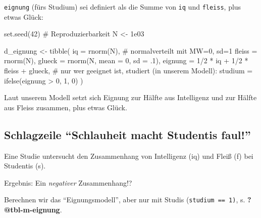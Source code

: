 \documentclass[
  a4paper,
  DIV=11]{scrreprt}
\newenvironment{Shaded}{\begin{snugshade}}{\end{snugshade}}
\newcommand{\AttributeTok}[1]{\textcolor[rgb]{0.40,0.45,0.13}{#1}}
\newcommand{\CommentTok}[1]{\textcolor[rgb]{0.37,0.37,0.37}{#1}}
\newcommand{\DecValTok}[1]{\textcolor[rgb]{0.68,0.00,0.00}{#1}}
\newcommand{\FloatTok}[1]{\textcolor[rgb]{0.68,0.00,0.00}{#1}}
\newcommand{\FunctionTok}[1]{\textcolor[rgb]{0.28,0.35,0.67}{#1}}
\newcommand{\NormalTok}[1]{\textcolor[rgb]{0.00,0.23,0.31}{#1}}
\newcommand{\OtherTok}[1]{\textcolor[rgb]{0.00,0.23,0.31}{#1}}
\newcommand{\SpecialCharTok}[1]{\textcolor[rgb]{0.37,0.37,0.37}{#1}}
\theoremstyle{definition}
\theoremstyle{remark}
\begin{document}
\texttt{eignung} (fürs Studium) sei definiert als die Summe von
\texttt{iq} und \texttt{fleiss}, plus etwas Glück:

\begin{Shaded}
\begin{Highlighting}[]
\FunctionTok{set.seed}\NormalTok{(}\DecValTok{42}\NormalTok{)  }\CommentTok{\# Reproduzierbarkeit}
\NormalTok{N }\OtherTok{\textless{}{-}} \FloatTok{1e03}  

\NormalTok{d\_eignung }\OtherTok{\textless{}{-}}
\FunctionTok{tibble}\NormalTok{(}
  \AttributeTok{iq =} \FunctionTok{rnorm}\NormalTok{(N),  }\CommentTok{\# normalverteilt mit MW=0, sd=1}
  \AttributeTok{fleiss =} \FunctionTok{rnorm}\NormalTok{(N),}
  \AttributeTok{glueck =} \FunctionTok{rnorm}\NormalTok{(N, }\AttributeTok{mean =} \DecValTok{0}\NormalTok{, }\AttributeTok{sd =}\NormalTok{ .}\DecValTok{1}\NormalTok{),}
  \AttributeTok{eignung =} \DecValTok{1}\SpecialCharTok{/}\DecValTok{2} \SpecialCharTok{*}\NormalTok{ iq }\SpecialCharTok{+} \DecValTok{1}\SpecialCharTok{/}\DecValTok{2} \SpecialCharTok{*}\NormalTok{ fleiss }\SpecialCharTok{+}\NormalTok{ glueck,}
  \CommentTok{\# nur wer geeignet ist, studiert (in unserem Modell):}
  \AttributeTok{studium =} \FunctionTok{ifelse}\NormalTok{(eignung }\SpecialCharTok{\textgreater{}} \DecValTok{0}\NormalTok{, }\DecValTok{1}\NormalTok{, }\DecValTok{0}\NormalTok{) }
\NormalTok{  )}
\end{Highlighting}
\end{Shaded}

Laut unserem Modell setzt sich Eignung zur Hälfte aus Intelligenz und
zur Hälfte aus Fleiss zusammen, plus etwas Glück.

\hypertarget{schlagzeile-schlauheit-macht-studentis-faul}{%
\subsection{Schlagzeile ``Schlauheit macht Studentis
faul!''}\label{schlagzeile-schlauheit-macht-studentis-faul}}

Eine Studie untersucht den Zusammenhang von Intelligenz (iq) und Fleiß
(f) bei Studentis (s).

Ergebnis: Ein \emph{negativer} Zusammenhang!?

Berechnen wir das ``Eignungsmodell'', aber nur mit Studis
(\texttt{studium\ ==\ 1)}, s. \textbf{?@tbl-m-eignung}.
\end{document}
